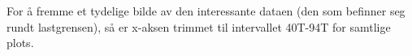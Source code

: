 For å fremme et tydelige bilde av den interessante dataen (den som befinner seg rundt lastgrensen), 
så er x-aksen trimmet til intervallet 40T-94T for samtlige plots.